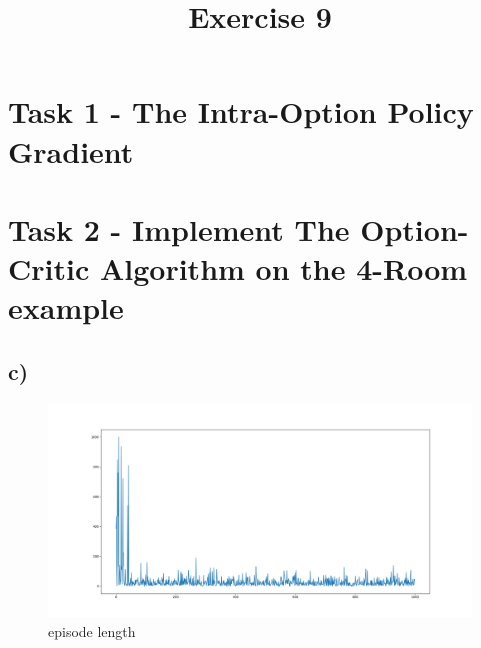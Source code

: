 \documentclass[a4paper]{article}
\date{}
\author{}
\title{\textbf{Exercise 9}}
\begin{document}
\maketitle 
\thispagestyle{fancy}

\section*{Task 1 - The Intra-Option Policy Gradient}

\section*{Task 2 - Implement The Option-Critic Algorithm on the 4-Room example}

\subsection*{c)}
\begin{figure}[!ht]
	\centering
	\includegraphics[width=0.7\linewidth]{episode_lenght}
	\caption{episode length}
	\label{fig:episodelenght}
\end{figure}
\end{document}
